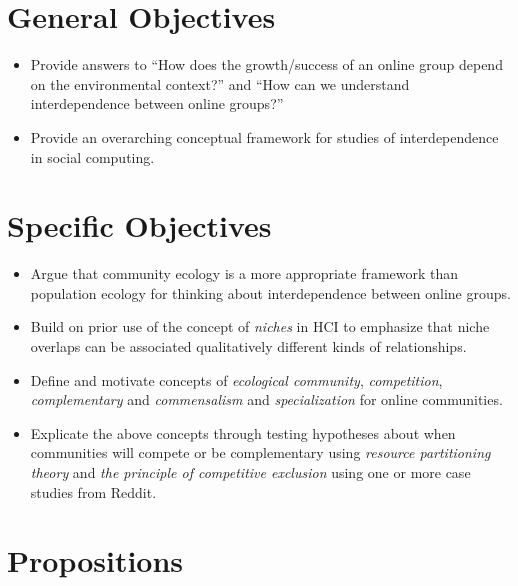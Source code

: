 \documentclass[12pt]{memoir}
\begin{document}
\section{General Objectives}

\begin{itemize}
\item Provide answers to ``How does the growth/success of an online group depend on the environmental context?''  and ``How can we understand interdependence between online groups?''

\item Provide an overarching conceptual framework for studies of interdependence in social computing.

\end{itemize}

\section{Specific Objectives}
\begin{itemize}

\item Argue that community ecology is a more appropriate framework than population ecology for thinking about interdependence between online groups.

\item Build on prior use of the concept of \emph{niches} in HCI to emphasize that niche overlaps can be associated qualitatively different kinds of relationships.   

\item Define and motivate concepts of \emph{ecological community}, \emph{competition}, \emph{complementary} and \emph{commensalism} and \emph{specialization} for online communities.

\item Explicate the above concepts through testing hypotheses about when communities will compete or be complementary using \emph{resource partitioning theory} and \emph{the principle of competitive exclusion} using one or more case studies from Reddit.

\end{itemize}

\section{Propositions}
\end{document}
